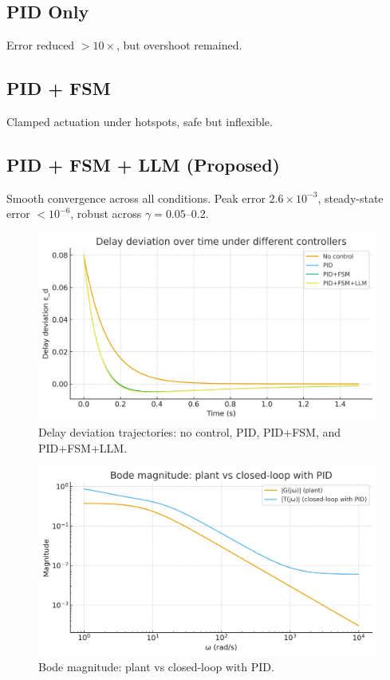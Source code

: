 \documentclass[conference]{IEEEtran}
\begin{document}
\subsection{PID Only}
Error reduced $>10\times$, but overshoot remained.  
\subsection{PID + FSM}
Clamped actuation under hotspots, safe but inflexible.  
\subsection{PID + FSM + LLM (Proposed)}
Smooth convergence across all conditions. Peak error $2.6 \times 10^{-3}$, steady-state error $<10^{-6}$, robust across $\gamma=0.05$--0.2.  
\begin{figure}[h]
\centering
\includegraphics[width=0.9\columnwidth]{fig2_time_response.png}
\caption{Delay deviation trajectories: no control, PID, PID+FSM, and PID+FSM+LLM.}
\label{fig:time}
\end{figure}
\begin{figure}[h]
\centering
\includegraphics[width=0.9\columnwidth]{fig3_bode_magnitude.png}
\caption{Bode magnitude: plant vs closed-loop with PID.}
\label{fig:bode}
\end{figure}
\end{document}
